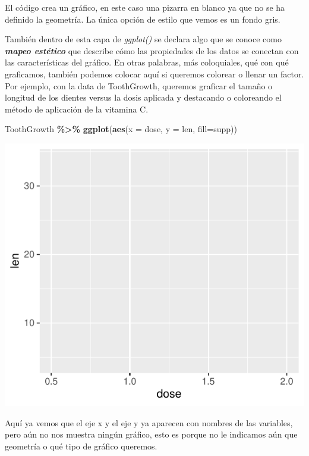 \documentclass[
]{book}
\newenvironment{Shaded}{\begin{snugshade}}{\end{snugshade}}
\newcommand{\AttributeTok}[1]{\textcolor[rgb]{0.13,0.29,0.53}{#1}}
\newcommand{\FunctionTok}[1]{\textcolor[rgb]{0.13,0.29,0.53}{\textbf{#1}}}
\newcommand{\NormalTok}[1]{#1}
\newcommand{\SpecialCharTok}[1]{\textcolor[rgb]{0.81,0.36,0.00}{\textbf{#1}}}
\begin{document}
El código crea un gráfico, en este caso una pizarra en blanco ya que no se ha definido la geometría.
La única opción de estilo que vemos es un fondo gris.

También dentro de esta capa de \emph{ggplot()} se declara algo que se conoce como \textbf{\emph{mapeo estético}} que describe cómo las propiedades de los datos se conectan con las características del gráfico.
En otras palabras, más coloquiales, qué con qué graficamos, también podemos colocar aquí si queremos colorear o llenar un factor.
Por ejemplo, con la data de ToothGrowth, queremos graficar el tamaño o longitud de los dientes versus la dosis aplicada y destacando o coloreando el método de aplicación de la vitamina C.\\

\begin{Shaded}
\begin{Highlighting}[]
\NormalTok{ToothGrowth }\SpecialCharTok{\%\textgreater{}\%} \FunctionTok{ggplot}\NormalTok{(}\FunctionTok{aes}\NormalTok{(}\AttributeTok{x =}\NormalTok{ dose, }\AttributeTok{y =}\NormalTok{ len, }\AttributeTok{fill=}\NormalTok{supp))}
\end{Highlighting}
\end{Shaded}

\begin{center}\includegraphics{_main_files/figure-latex/unnamed-chunk-205-1} \end{center}

Aquí ya vemos que el eje x y el eje y ya aparecen con nombres de las variables, pero aún no nos muestra ningún gráfico, esto es porque no le indicamos aún que geometría o qué tipo de gráfico queremos.
\end{document}
